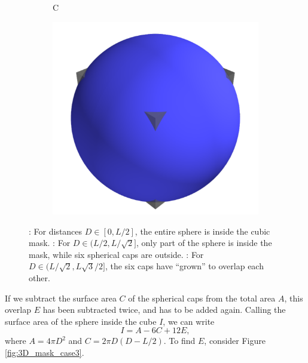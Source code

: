\begin{figure}[ht]
\begin{subfigure}[b]{0.32\textwidth}
    \label{subfig:sphere_B}
\end{subfigure}
\begin{subfigure}[b]{0.32\textwidth}
	  \begin{flushleft}
	  \large C
		\end{flushleft}
    \centering
    \includegraphics[width=\textwidth]{case3.pdf}
    \label{subfig:sphere_C}
\end{subfigure}
\caption[Illustration of the effect of a cubic mask on the radial distribution function]{: For distances $D \in [0, L/2]$, the entire sphere is inside the cubic mask. : For $D \in (L/2, L/\sqrt{2}]$, only part of the sphere is inside the mask, while six spherical caps are outside. : For $D \in (L/\sqrt{2}, L\sqrt{3}/2]$, the six caps have ``grown'' to overlap each other.}
\label{fig:sphere}
\end{figure}
If we subtract the surface area $C$ of the spherical caps from the total area $A$, this overlap $E$ has been subtracted twice, and has to be added again. Calling the surface area of the sphere inside the cube $I$, we can write
\begin{equation}
I = A - 6C + 12E,
\end{equation}
where $A = 4\pi D^2$ and $C = 2\pi D\left(D-L/2\right)$. To find $E$, consider Figure \ref{fig:3D_mask_case3}.
